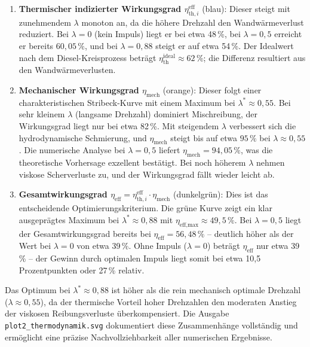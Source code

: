 ﻿\documentclass[a4paper,12pt]{article}
\begin{document}
\begin{enumerate}
  \item \textbf{Thermischer indizierter Wirkungsgrad $\eta_{\text{th},i}^{\text{eff}}$}
    (blau): Dieser steigt mit zunehmendem $\lambda$ monoton an, da die höhere
    Drehzahl den Wandwärmeverlust reduziert. Bei $\lambda = 0$ (kein Impuls)
    liegt er bei etwa 48\,\%, bei $\lambda = 0{,}5$ erreicht er bereits
    $60{,}05\,\%$, und bei $\lambda = 0{,}88$ steigt er auf etwa 54\,\%.
    Der Idealwert nach dem Diesel-Kreisprozess beträgt
    $\eta_\text{th}^\text{ideal} \approx 62\,\%$; die Differenz resultiert
    aus den Wandwärmeverlusten.

  \item \textbf{Mechanischer Wirkungsgrad $\eta_\text{mech}$} (orange):
    Dieser folgt einer charakteristischen Stribeck-Kurve mit einem Maximum
    bei $\lambda^* \approx 0{,}55$. Bei sehr kleinem $\lambda$ (langsame Drehzahl)
    dominiert Mischreibung, der Wirkungsgrad liegt nur bei etwa 82\,\%. Mit
    steigendem $\lambda$ verbessert sich die hydrodynamische Schmierung, und
    $\eta_\text{mech}$ steigt bis auf etwa $95\,\%$ bei $\lambda \approx 0{,}55$.
    Die numerische Analyse bei $\lambda = 0{,}5$ liefert $\eta_\text{mech} = 94{,}05\,\%$,
    was die theoretische Vorhersage exzellent bestätigt. Bei noch höherem $\lambda$
    nehmen viskose Scherverluste zu, und der Wirkungsgrad fällt wieder leicht ab.

  \item \textbf{Gesamtwirkungsgrad $\eta_\text{eff} = \eta_{\text{th},i}^{\text{eff}} \cdot \eta_\text{mech}$}
    (dunkelgrün): Dies ist das entscheidende Optimierungskriterium. Die grüne
    Kurve zeigt ein klar ausgeprägtes Maximum bei $\lambda^* \approx 0{,}88$
    mit $\eta_\text{eff,max} \approx 49{,}5\,\%$. Bei $\lambda = 0{,}5$ liegt
    der Gesamtwirkungsgrad bereits bei $\eta_\text{eff} = 56{,}48\,\%$ -- deutlich
    höher als der Wert bei $\lambda = 0$ von etwa 39\,\%. Ohne Impuls ($\lambda = 0$)
    beträgt $\eta_\text{eff}$ nur etwa 39\,\% -- der Gewinn durch optimalen
    Impuls liegt somit bei etwa 10{,}5 Prozentpunkten oder 27\,\% relativ.
\end{enumerate}

Das Optimum bei $\lambda^* \approx 0{,}88$ ist höher als die rein mechanisch
optimale Drehzahl ($\lambda \approx 0{,}55$), da der thermische Vorteil
hoher Drehzahlen den moderaten Anstieg der viskosen Reibungsverluste überkompensiert.
Die Ausgabe \texttt{plot2\_thermodynamik.svg} dokumentiert diese Zusammenhänge
vollständig und ermöglicht eine präzise Nachvollziehbarkeit aller numerischen
Ergebnisse.
\end{document}
